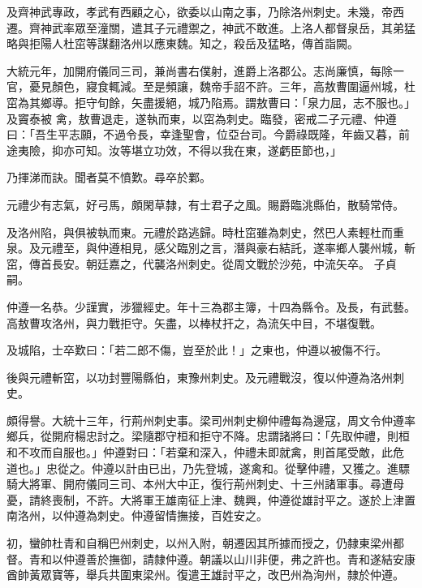 \begin{pinyinscope}
 及齊神武專政，孝武有西顧之心，欲委以山南之事，乃除洛州刺史。未幾，帝西遷。齊神武率眾至潼關，遣其子元禮禦之，神武不敢進。上洛人都督泉岳，其弟猛略與拒陽人杜窋等謀翻洛州以應東魏。知之，殺岳及猛略，傳首詣闕。



 大統元年，加開府儀同三司，兼尚書右僕射，進爵上洛郡公。志尚廉慎，每除一官，憂見顏色，寢食輒減。至是頻讓，魏帝手詔不許。三年，高敖曹圍逼州城，杜窋為其鄉導。拒守旬餘，矢盡援絕，城乃陷焉。謂敖曹曰：「泉力屈，志不服也。」及竇泰被
 禽，敖曹退走，遂執而東，以窋為刺史。臨發，密戒二子元禮、仲遵曰：「吾生平志願，不過令長，幸逢聖會，位亞台司。今爵祿既隆，年齒又暮，前途夷險，抑亦可知。汝等堪立功效，不得以我在東，遂虧臣節也，」



 乃揮涕而訣。聞者莫不憤歎。尋卒於鄴。



 元禮少有志氣，好弓馬，頗閑草隸，有士君子之風。賜爵臨洮縣伯，散騎常侍。



 及洛州陷，與俱被執而東。元禮於路逃歸。時杜窋雖為刺史，然巴人素輕杜而重泉。及元禮至，與仲遵相見，感父臨別之言，潛與豪右結託，遂率鄉人襲州城，斬窋，傳首長安。朝廷嘉之，代襲洛州刺史。從周文戰於沙苑，中流矢卒。
 子貞嗣。



 仲遵一名恭。少謹實，涉獵經史。年十三為郡主簿，十四為縣令。及長，有武藝。高敖曹攻洛州，與力戰拒守。矢盡，以棒杖扞之，為流矢中目，不堪復戰。



 及城陷，士卒歎曰：「若二郎不傷，豈至於此！」之東也，仲遵以被傷不行。



 後與元禮斬窋，以功封豐陽縣伯，東豫州刺史。及元禮戰沒，復以仲遵為洛州刺史。



 頗得譽。大統十三年，行荊州刺史事。梁司州刺史柳仲禮每為邊寇，周文令仲遵率鄉兵，從開府楊忠討之。梁隨郡守桓和拒守不降。忠謂諸將曰：「先取仲禮，則桓和不攻而自服也。」仲遵對曰：「若棄和深入，仲禮未即就禽，則首尾受敵，此危
 道也。」忠從之。仲遵以計由已出，乃先登城，遂禽和。從擊仲禮，又獲之。進驃騎大將軍、開府儀同三司、本州大中正，復行荊州刺史、十三州諸軍事。尋遭母憂，請終喪制，不許。大將軍王雄南征上津、魏興，仲遵從雄討平之。遂於上津置南洛州，以仲遵為刺史。仲遵留情撫接，百姓安之。



 初，蠻帥杜青和自稱巴州刺史，以州入附，朝遷因其所據而授之，仍隸東梁州都督。青和以仲遵善於撫御，請隸仲遵。朝議以山川非便，弗之許也。青和遂結安康酋帥黃眾寶等，舉兵共圍東梁州。復遣王雄討平之，改巴州為洵州，隸於仲遵。




\end{pinyinscope}
